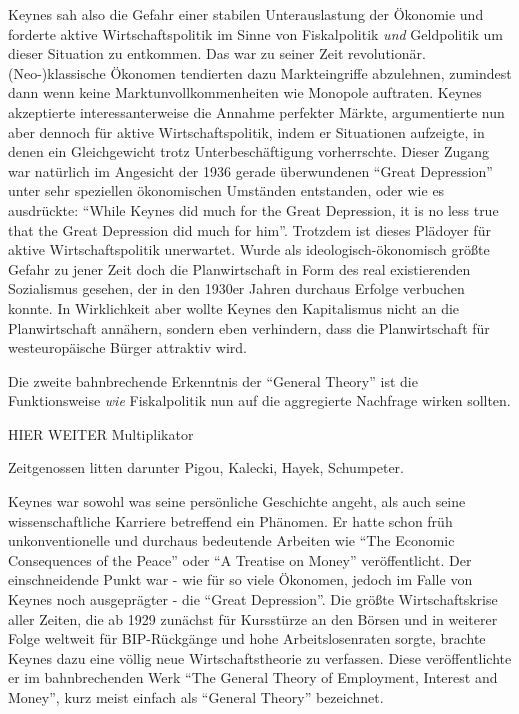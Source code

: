 Keynes sah also die Gefahr einer stabilen Unterauslastung der Ökonomie und forderte aktive Wirtschaftspolitik im Sinne von Fiskalpolitik \textit{und} Geldpolitik um dieser Situation zu entkommen. Das war zu seiner Zeit revolutionär. (Neo-)klassische Ökonomen tendierten dazu Markteingriffe abzulehnen, zumindest dann wenn keine Marktunvollkommenheiten wie Monopole auftraten. Keynes akzeptierte interessanterweise die Annahme perfekter Märkte, argumentierte nun aber dennoch für aktive Wirtschaftspolitik, indem er Situationen aufzeigte, in denen ein Gleichgewicht trotz Unterbeschäftigung vorherrschte. Dieser Zugang war natürlich im Angesicht der 1936 gerade überwundenen "`Great Depression"' unter sehr speziellen ökonomischen Umständen entstanden, oder wie \textcite[S. 199]{Samuelson1946} es ausdrückte: "`While Keynes did much for the Great Depression, it is no less true that the Great Depression did much for him"'. Trotzdem ist dieses Plädoyer für aktive Wirtschaftspolitik unerwartet. Wurde als ideologisch-ökonomisch größte Gefahr zu jener Zeit doch die Planwirtschaft in Form des real existierenden Sozialismus gesehen, der in den 1930er Jahren durchaus Erfolge verbuchen konnte. In Wirklichkeit aber wollte Keynes den Kapitalismus nicht an die Planwirtschaft annähern, sondern eben verhindern, dass die Planwirtschaft für westeuropäische Bürger attraktiv wird.

Die zweite bahnbrechende Erkenntnis der "`General Theory"' ist die Funktionsweise \textit{wie} Fiskalpolitik nun auf die aggregierte Nachfrage wirken sollten.

HIER WEITER Multiplikator \parencite[S. 58]{Snowdon2005}






Zeitgenossen litten darunter Pigou, Kalecki, Hayek, Schumpeter. 








Keynes war sowohl was seine persönliche Geschichte angeht, als auch seine wissenschaftliche Karriere betreffend ein Phänomen. Er hatte schon früh unkonventionelle und durchaus bedeutende Arbeiten wie \textcite{Keynes1919} "`The Economic Consequences of the Peace"' oder \textcite{Keynes1930} "`A Treatise on Money"' veröffentlicht. Der einschneidende Punkt war - wie für so viele Ökonomen, jedoch im Falle von Keynes noch ausgeprägter - die "`Great Depression"'. Die größte Wirtschaftskrise aller Zeiten,  die ab 1929 zunächst für Kursstürze an den Börsen und in weiterer Folge weltweit für BIP-Rückgänge und hohe Arbeitslosenraten sorgte, brachte Keynes dazu eine völlig neue Wirtschaftstheorie zu verfassen. Diese veröffentlichte er im bahnbrechenden Werk \textcite{Keynes1936} "`The General Theory of Employment, Interest and Money"', kurz meist einfach als "`General Theory"' bezeichnet. 


